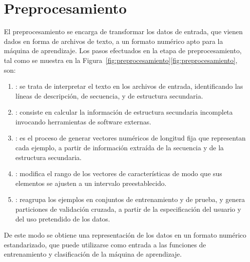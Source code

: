 %
%
%
\section{Preprocesamiento}
%
El preprocesamiento se encarga de transformar los datos de entrada,
que vienen dados en forma de archivos de texto, a un formato numérico
apto para la máquina de aprendizaje.
Los pasos efectuados en la etapa de preprocesamiento, tal como se muestra en la
\iflatexml{}Figura~\ref{fig:preprocesamiento}\else\autoref{fig:preprocesamiento}\fi{},
son:
%
\begin{enumerate}
\item
  : se trata de interpretar el texto en los
  archivos de entrada, identificando las líneas de descripción, de
  secuencia, y de estructura secundaria.
\item
  : consiste en calcular la información de estructura
  secundaria incompleta invocando herramientas de software externas.
\item
  : es el proceso de generar vectores
  numéricos de longitud fija que representan cada ejemplo, a partir de
  información extraída de la secuencia y de la estructura secundaria.
\item
  : modifica el rango de los vectores de
  características de modo que sus elementos se ajusten a un intervalo
  preestablecido.
\item
  : reagrupa los ejemplos en
  conjuntos de entrenamiento y de prueba, y genera particiones de
  validación cruzada, a partir de la especificación del usuario y del
  uso pretendido de los datos.
\end{enumerate}
%
De este modo se obtiene una representación de los datos en un formato
numérico estandarizado, que puede utilizarse como entrada a las
funciones de entrenamiento y clasificación de la máquina de
aprendizaje.
